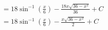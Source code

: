 \documentclass[preview]{standalone}
\begin{document}
\begin{align*}
&=18\sin^{-1}(\frac{x}{6})-\frac{18x\sqrt{36-x^2}}{36} + C \\ &=18\sin^{-1}(\frac{x}{6})-\frac{x\sqrt{36-x^2}}{2} + C
\end{align*}
\end{document}
